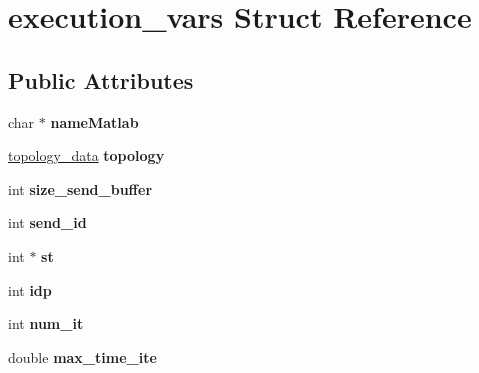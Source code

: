 \hypertarget{structexecution__vars}{\section{execution\-\_\-vars Struct Reference}
\label{structexecution__vars}
}
\subsection*{Public Attributes}
\begin{DoxyCompactItemize}
\item 
\hypertarget{structexecution__vars_a203af792baab9c5cd8b7c12d620a2444}{char $\ast$ {\bfseries name\-Matlab}}\label{structexecution__vars_a203af792baab9c5cd8b7c12d620a2444}

\item 
\hypertarget{structexecution__vars_a9ff3063e55ca3ca1969fcdaba32f9b2c}{\hyperlink{structtopology__data}{topology\-\_\-data} {\bfseries topology}}\label{structexecution__vars_a9ff3063e55ca3ca1969fcdaba32f9b2c}

\item 
\hypertarget{structexecution__vars_a6cc90a3a4c3cd2e836658f380ee169cf}{int {\bfseries size\-\_\-send\-\_\-buffer}}\label{structexecution__vars_a6cc90a3a4c3cd2e836658f380ee169cf}

\item 
\hypertarget{structexecution__vars_a35addc4237253d9a26a8fe7799b420e0}{int {\bfseries send\-\_\-id}}\label{structexecution__vars_a35addc4237253d9a26a8fe7799b420e0}

\item 
\hypertarget{structexecution__vars_a82ea7e1a19312aaf518ce5e82698e74d}{int $\ast$ {\bfseries st}}\label{structexecution__vars_a82ea7e1a19312aaf518ce5e82698e74d}

\item 
\hypertarget{structexecution__vars_a694094b5e9d0031f6373d03d1adfcc5e}{int {\bfseries idp}}\label{structexecution__vars_a694094b5e9d0031f6373d03d1adfcc5e}

\item 
\hypertarget{structexecution__vars_a62273d2b43856c0f5da574d3b769c3c4}{int {\bfseries num\-\_\-it}}\label{structexecution__vars_a62273d2b43856c0f5da574d3b769c3c4}

\item 
\hypertarget{structexecution__vars_af88bb0ffb4376645ca0c5af8dfecae4c}{double {\bfseries max\-\_\-time\-\_\-ite}}\label{structexecution__vars_af88bb0ffb4376645ca0c5af8dfecae4c}


\end{DoxyCompactItemize}
